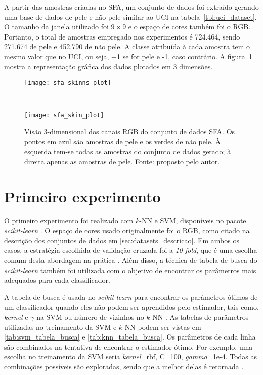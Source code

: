 A partir das amostras criadas no SFA, um conjunto de dados foi extraído gerando uma base de dados de pele e não pele similar ao UCI na tabela~\ref{tbl:uci_dataset}. O tamanho da janela utilizado foi $9 \times 9$ e o espaço de cores também foi o RGB. Portanto, o total de amostras empregado nos experimentos é 724.464, sendo 271.674 de pele e 452.790 de não pele. A classe atribuída à cada amostra tem o mesmo valor que no UCI, ou seja, +1 se for pele e -1, caso contrário. A figura~\ref{fig:dataset_sfa} mostra a representação gráfica dos dados plotados em 3 dimensões.
\begin{figure}[h]
    \centering
    \begin{minipage}{0.45\textwidth}
        \texttt{[image: sfa\_skinns\_plot]}
    \end{minipage}
    ~ %
    \begin{minipage}{0.45\textwidth}
        \texttt{[image: sfa\_skin\_plot]}
    \end{minipage}
    \caption[Visão 3-dimensional dos canais RGB do conjunto de dados SFA]{Visão 3-dimensional dos canais RGB do conjunto de dados SFA. Os pontos em azul são amostras de pele e os verdes de não pele. À esquerda tem-se todas as amostras do conjunto de dados gerado; à direita apenas as amostras de pele. Fonte: proposto pelo autor.}
    \label{fig:dataset_sfa}
\end{figure}

\section{Primeiro experimento}
\label{sec:experimento_um}
O primeiro experimento foi realizado com $k$-NN e SVM, disponíveis no pacote \emph{scikit-learn} \citep{scikit-learn:11}. O espaço de cores usado originalmente foi o RGB, como citado na descrição dos conjuntos de dados em \ref{sec:datasets_descricao}. Em ambos os casos, a estratégia escolhida de validação cruzada foi a \emph{10-fold}, que é uma escolha comum desta abordagem na prática \citep{mostafa:12}. Além disso, a técnica de tabela de busca do \emph{scikit-learn} também foi utilizada com o objetivo de encontrar os parâmetros mais adequados para cada classificador.

A tabela de busca é usada no \emph{scikit-learn} para encontrar os parâmetros ótimos de um classificador quando eles não podem ser aprendidos pelo estimador, tais como, \emph{kernel} e $\gamma$ na SVM ou número de vizinhos no $k$-NN \citep{scikit-learn:11}. As tabelas de parâmetros utilizadas no treinamento da SVM e $k$-NN podem ser vistas em \ref{tab:svm_tabela_busca} e \ref{tab:knn_tabela_busca}. Os parâmetros de cada linha são combinados na tentativa de encontrar o estimador ótimo. Por exemplo, uma escolha no treinamento da SVM seria \emph{kernel}=rbf, C=100, \emph{gamma}=1e-4. Todas as combinações possíveis são exploradas, sendo que a melhor delas é retornada \citep{scikit-learn:11}.

